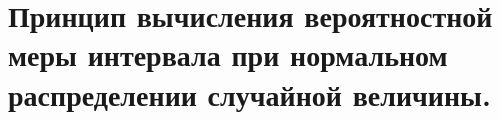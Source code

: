 \documentclass[polytech/stats/exam-2023/stats-exam-2023.tex]{subfiles}
\begin{document}
\section{Принцип вычисления вероятностной меры интервала при нормальном распределении случайной величины.}
\end{document}
